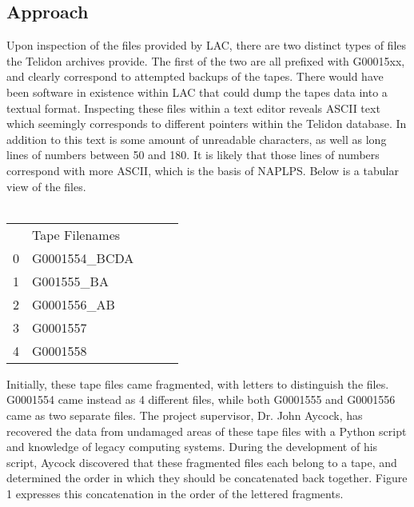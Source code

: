 \documentclass[sigconf]{acmart}
\begin{document}
\subsection{Approach}

Upon inspection of the files provided by LAC, there are two distinct types of files the Telidon archives provide. The first of the two are all prefixed with G00015xx, and clearly correspond to attempted backups of the tapes. There would have been software in existence within LAC that could dump the tapes data into a textual format. Inspecting these files within a text editor reveals ASCII text which seemingly corresponds to different pointers within the Telidon database. In addition to this text is some amount of unreadable characters, as well as long lines of numbers between 50 and 180. It is likely that those lines of numbers correspond with more ASCII, which is the basis of NAPLPS. Below is a tabular view of the files. \\ \\

\begin{table}[h]
\begin{tabular}{|l|l|lll}
\cline{1-2}
  & Tape Filenames &  &  &  \\ \cline{1-2}
0 & G0001554\_BCDA &  &  &  \\ \cline{1-2}
1 & G001555\_BA   &  &  &  \\ \cline{1-2}
2 & G0001556\_AB   &  &  &  \\ \cline{1-2}
3 & G0001557       &  &  &  \\ \cline{1-2}
4 & G0001558       &  &  &  \\ \cline{1-2}
\end{tabular}
\end{table}

Initially, these tape files came fragmented, with letters to distinguish the files. G0001554 came instead as 4 different files, while both G0001555 and G0001556 came as two separate files. The project supervisor, Dr. John Aycock, has recovered the data from undamaged areas of these tape files with a Python script and knowledge of legacy computing systems. During the development of his script, Aycock discovered that these fragmented files each belong to a tape, and determined the order in which they should be concatenated back together. Figure 1 expresses this concatenation in the order of the lettered fragments. \\ \\
\end{document}
